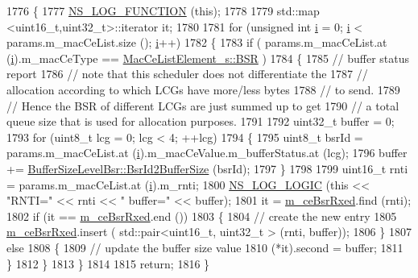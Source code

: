 \begin{DoxyCode}
1776 \{
1777   \hyperlink{log-macros-disabled_8h_a90b90d5bad1f39cb1b64923ea94c0761}{NS\_LOG\_FUNCTION} (\textcolor{keyword}{this});
1778 
1779   std::map <uint16\_t,uint32\_t>::iterator it;
1780 
1781   \textcolor{keywordflow}{for} (\textcolor{keywordtype}{unsigned} \textcolor{keywordtype}{int} \hyperlink{bernuolliDistribution_8m_a6f6ccfcf58b31cb6412107d9d5281426}{i} = 0; \hyperlink{bernuolliDistribution_8m_a6f6ccfcf58b31cb6412107d9d5281426}{i} < params.m\_macCeList.size (); \hyperlink{bernuolliDistribution_8m_a6f6ccfcf58b31cb6412107d9d5281426}{i}++)
1782     \{
1783       \textcolor{keywordflow}{if} ( params.m\_macCeList.at (\hyperlink{bernuolliDistribution_8m_a6f6ccfcf58b31cb6412107d9d5281426}{i}).m\_macCeType == \hyperlink{structns3_1_1MacCeListElement__s_a270a6526dfc7da02e9dc91823c290f6bac50796b01160b1825ec34efa1ad9f051}{MacCeListElement\_s::BSR} )
1784         \{
1785           \textcolor{comment}{// buffer status report}
1786           \textcolor{comment}{// note that this scheduler does not differentiate the}
1787           \textcolor{comment}{// allocation according to which LCGs have more/less bytes}
1788           \textcolor{comment}{// to send.}
1789           \textcolor{comment}{// Hence the BSR of different LCGs are just summed up to get}
1790           \textcolor{comment}{// a total queue size that is used for allocation purposes.}
1791 
1792           uint32\_t buffer = 0;
1793           \textcolor{keywordflow}{for} (uint8\_t lcg = 0; lcg < 4; ++lcg)
1794             \{
1795               uint8\_t bsrId = params.m\_macCeList.at (\hyperlink{bernuolliDistribution_8m_a6f6ccfcf58b31cb6412107d9d5281426}{i}).m\_macCeValue.m\_bufferStatus.at (lcg);
1796               buffer += \hyperlink{classns3_1_1BufferSizeLevelBsr_a67fc905f267ed8ac5a617fe229699122}{BufferSizeLevelBsr::BsrId2BufferSize} (bsrId);
1797             \}
1798           
1799           uint16\_t rnti = params.m\_macCeList.at (\hyperlink{bernuolliDistribution_8m_a6f6ccfcf58b31cb6412107d9d5281426}{i}).m\_rnti;
1800           \hyperlink{group__logging_ga88acd260151caf2db9c0fc84997f45ce}{NS\_LOG\_LOGIC} (\textcolor{keyword}{this} << \textcolor{stringliteral}{"RNTI="} << rnti << \textcolor{stringliteral}{" buffer="} << buffer);
1801           it = \hyperlink{classns3_1_1FdMtFfMacScheduler_a10a21cad9af4c783734123f38e697316}{m\_ceBsrRxed}.find (rnti);
1802           \textcolor{keywordflow}{if} (it == \hyperlink{classns3_1_1FdMtFfMacScheduler_a10a21cad9af4c783734123f38e697316}{m\_ceBsrRxed}.end ())
1803             \{
1804               \textcolor{comment}{// create the new entry}
1805               \hyperlink{classns3_1_1FdMtFfMacScheduler_a10a21cad9af4c783734123f38e697316}{m\_ceBsrRxed}.insert ( std::pair<uint16\_t, uint32\_t > (rnti, buffer));
1806             \}
1807           \textcolor{keywordflow}{else}
1808             \{
1809               \textcolor{comment}{// update the buffer size value}
1810               (*it).second = buffer;
1811             \}
1812         \}
1813     \}
1814 
1815   \textcolor{keywordflow}{return};
1816 \}
\end{DoxyCode}


